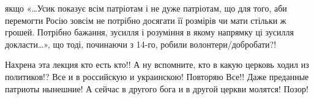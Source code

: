 \begin{itemize}
якщо «…Усик показує всім патріотам і не дуже патріотам, що для того, аби
перемогти Росію зовсім не потрібно досягати її розмірів чи мати стільки ж
грошей. Потрібно бажання, зусилля і розуміння в якому напрямку ці зусилля
докласти…», що тоді, починаючи з 14-го, робили волонтери/добробати?!


Нахрена эта лекция кто есть кто!!  А ну вспомните, кто в какую церковь ходил из
политиков!?  Все и в российскую и украинскою! Повторяю Все!! Даже преданные
патриоты нынешние!  А сейчас в другого бога и в другой церкви молятся! Позор!


\end{itemize} %
